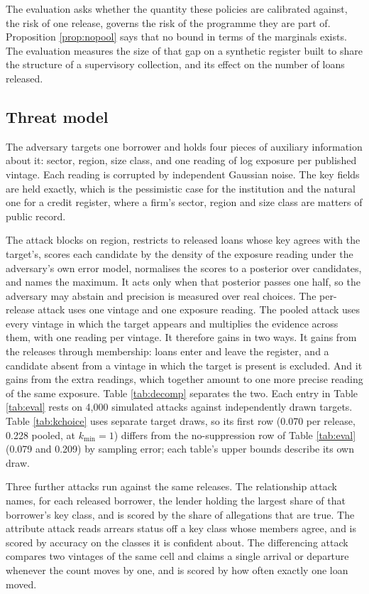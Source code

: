 \documentclass[11pt,a4paper]{article}
\theoremstyle{plain}
\theoremstyle{definition}
\begin{document}
The evaluation asks whether the quantity these policies are calibrated against,
the risk of one release, governs the risk of the programme they are part of.
Proposition \ref{prop:nopool} says that no bound in terms of the marginals
exists. The evaluation measures the size of that gap on a synthetic register
built to share the structure of a supervisory collection, and its effect on the
number of loans released.

\subsection{Threat model}\label{sec:eval-threat}

The adversary targets one borrower and holds four pieces of auxiliary information
about it: sector, region, size class, and one reading of log exposure per published
vintage. Each reading is corrupted by independent Gaussian noise. The key fields are
held exactly, which is the pessimistic case for the institution and the natural one
for a credit register, where a firm's sector, region and size class are matters of
public record.

The attack blocks on region, restricts to released loans whose key agrees with the
target's, scores each candidate by the density of the exposure reading under the
adversary's own error model, normalises the scores to a posterior over candidates,
and names the maximum. It acts only when that posterior passes one half, so the
adversary may abstain and precision is measured over real choices. The
per-release attack uses one vintage and one exposure reading. The pooled attack
uses every vintage in which the target appears and multiplies the evidence
across them, with one reading per vintage. It therefore gains in two ways. It
gains from the releases through membership: loans enter and leave the register,
and a candidate absent from a vintage in which the target is present is
excluded. And it gains from the extra readings, which together amount to one
more precise reading of the same exposure. Table \ref{tab:decomp} separates the
two. Each entry in Table \ref{tab:eval} rests on 4{,}000 simulated attacks
against independently drawn targets. Table \ref{tab:kchoice} uses separate target
draws, so its first row (0.070 per release, 0.228 pooled, at $k_{\min}=1$)
differs from the no-suppression row of Table \ref{tab:eval} (0.079 and 0.209) by
sampling error; each table's upper bounds describe its own draw.

Three further attacks run against the same releases. The relationship attack names,
for each released borrower, the lender holding the largest share of that borrower's
key class, and is scored by the share of allegations that are true. The attribute
attack reads arrears status off a key class whose members agree, and is scored by
accuracy on the classes it is confident about. The differencing attack compares two
vintages of the same cell and claims a single arrival or departure whenever the
count moves by one, and is scored by how often exactly one loan moved.
\end{document}
